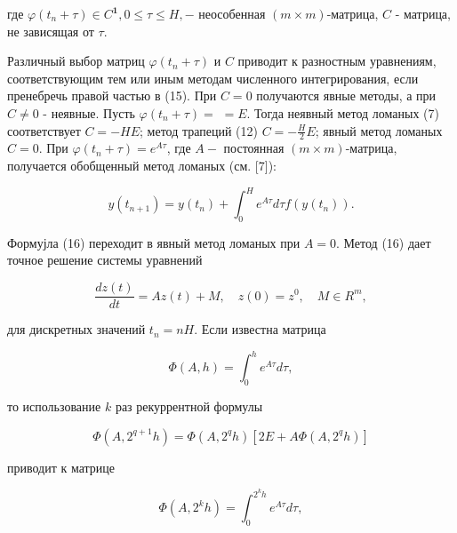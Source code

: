 \documentclass[10pt]{article}
\begin{document}
где $\varphi\left(t_{n}+\tau\right) \in C^{\mathbf{1}}, 0 \leqslant \tau \leqslant H,-$ неособенная $(m \times m)$-матрица, $C$ - матрица, не зависящая от $\tau$.



Различный выбор матриц $\varphi\left(t_{n}+\tau\right)$ и $C$ приводит к разностным уравнениям, соответствующим тем или иным методам численного интегрирования, если пренебречь правой частью в (15). При $C=0$ получаются явные методы, а при $C \neq 0$ - неявные. Пусть $\varphi\left(t_{n}+\tau\right)=$ $=E$. Тогда неявный метод ломаных (7) соответствует $C=-H E$; метод трапеций (12) $C=-\frac{H}{2} E$; явный метод ломаных $C=0$. При $\varphi\left(t_{n}+\tau\right)=e^{A \tau}$, где $A-$ постоянная $(m \times m)$-матрица, получается обобщенный метод ломаных (см. [7]):



\[

y\left(t_{n+1}\right)=y\left(t_{n}\right)+\int_{0}^{H} e^{A \tau} d \tau f\left(y\left(t_{n}\right)\right) .

\]



Формујла (16) переходит в явный метод ломаных при $A=0$. Метод (16) дает точное решение системы уравнений



\[

\frac{d z(t)}{d t}=A z(t)+M, \quad z(0)=z^{0}, \quad M \in R^{m},

\]



для дискретных значений $t_{n}=n H$. Если известна матрица



\[

\Phi(A, h)=\int_{0}^{h} e^{A \tau} d \tau,

\]



то использование $k$ раз рекуррентной формулы



\[

\Phi\left(A, 2^{q+1} h\right)=\Phi\left(A, 2^{q} h\right)\left[2 E+A \Phi\left(A, 2^{q} h\right)\right]

\]



приводит к матрице



\[

\Phi\left(A, 2^{k} h\right)=\int_{0}^{2^{k} h} e^{A \tau} d \tau,

\]
\end{document}
